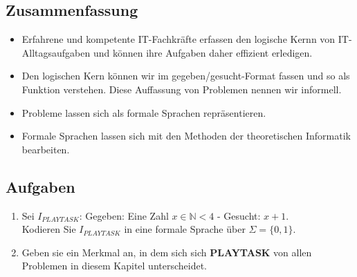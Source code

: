 \subsection*{Zusammenfassung}
\begin{itemize}
    \item Erfahrene und kompetente IT-Fachkräfte erfassen den logische Kernn
        von IT-Alltagsaufgaben und können ihre Aufgaben daher effizient erledigen.
    \item Den logischen Kern können wir im gegeben/gesucht-Format fassen
        und so als Funktion verstehen. Diese Auffassung von Problemen nennen wir informell.
    \item Probleme lassen sich als formale Sprachen repräsentieren.
    \item Formale Sprachen lassen sich mit den Methoden der theoretischen Informatik
        bearbeiten.
\end{itemize}
\subsection*{Aufgaben}
\begin{enumerate}
    \item Sei $I_{PLAYTASK}$: Gegeben: Eine Zahl $x \in \mathbb{N} < 4$ - Gesucht: $x + 1$.\\
        Kodieren Sie $I_{PLAYTASK}$ in eine formale Sprache über $\Sigma = \{0,1\}$.
    \item Geben sie ein Merkmal an, in dem sich sich \textbf{PLAYTASK} von allen Problemen
        in diesem Kapitel unterscheidet.
\end{enumerate}
